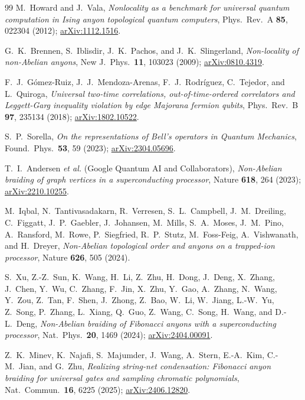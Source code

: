 \documentclass[aps,prx,reprint,amsmath,amssymb,floatfix,nofootinbib,superscriptaddress]{revtex4-2}
\begin{document}
\begin{thebibliography}{99}
M.~Howard and J.~Vala,
\emph{Nonlocality as a benchmark for universal quantum computation in Ising anyon topological quantum computers},
Phys.\ Rev.\ A \textbf{85}, 022304 (2012);
\href{https://arxiv.org/abs/1112.1516}{arXiv:1112.1516}.

G.~K.~Brennen, S.~Iblisdir, J.~K.~Pachos, and J.~K.~Slingerland,
\emph{Non-locality of non-Abelian anyons},
New J.\ Phys.\ \textbf{11}, 103023 (2009);
\href{https://arxiv.org/abs/0810.4319}{arXiv:0810.4319}.

F.~J.~G\'omez-Ruiz, J.~J.~Mendoza-Arenas, F.~J.~Rodr\'iguez,
C.~Tejedor, and L.~Quiroga,
\emph{Universal two-time correlations, out-of-time-ordered
correlators and Leggett-Garg inequality violation by edge Majorana
fermion qubits},
Phys.\ Rev.\ B \textbf{97}, 235134 (2018);
\href{https://arxiv.org/abs/1802.10522}{arXiv:1802.10522}.

S.~P.~Sorella,
\emph{On the representations of Bell's operators in Quantum Mechanics},
Found.\ Phys.\ \textbf{53}, 59 (2023);
\href{https://arxiv.org/abs/2304.05696}{arXiv:2304.05696}.

T.~I.~Andersen \emph{et al.} (Google Quantum AI and Collaborators),
\emph{Non-Abelian braiding of graph vertices in a superconducting processor},
Nature \textbf{618}, 264 (2023);
\href{https://arxiv.org/abs/2210.10255}{arXiv:2210.10255}.

M.~Iqbal, N.~Tantivasadakarn, R.~Verresen, S.~L.~Campbell,
J.~M.~Dreiling, C.~Figgatt, J.~P.~Gaebler, J.~Johansen, M.~Mills,
S.~A.~Moses, J.~M.~Pino, A.~Ransford, M.~Rowe, P.~Siegfried, R.~P.~Stutz,
M.~Foss-Feig, A.~Vishwanath, and H.~Dreyer,
\emph{Non-Abelian topological order and anyons on a trapped-ion processor},
Nature \textbf{626}, 505 (2024).

S.~Xu, Z.-Z.~Sun, K.~Wang, H.~Li, Z.~Zhu, H.~Dong, J.~Deng, X.~Zhang,
J.~Chen, Y.~Wu, C.~Zhang, F.~Jin, X.~Zhu, Y.~Gao, A.~Zhang, N.~Wang,
Y.~Zou, Z.~Tan, F.~Shen, J.~Zhong, Z.~Bao, W.~Li, W.~Jiang, L.-W.~Yu,
Z.~Song, P.~Zhang, L.~Xiang, Q.~Guo, Z.~Wang, C.~Song, H.~Wang,
and D.-L.~Deng,
\emph{Non-Abelian braiding of Fibonacci anyons with a superconducting processor},
Nat.\ Phys.\ \textbf{20}, 1469 (2024);
\href{https://arxiv.org/abs/2404.00091}{arXiv:2404.00091}.

Z.~K.~Minev, K.~Najafi, S.~Majumder, J.~Wang, A.~Stern,
E.-A.~Kim, C.-M.~Jian, and G.~Zhu,
\emph{Realizing string-net condensation: Fibonacci anyon braiding
for universal gates and sampling chromatic polynomials},
Nat.\ Commun.\ \textbf{16}, 6225 (2025);
\href{https://arxiv.org/abs/2406.12820}{arXiv:2406.12820}.


\end{thebibliography}
\end{document}

